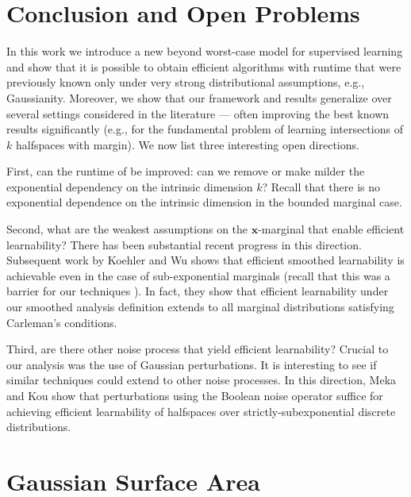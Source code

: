 \documentclass{theoretics}
\renewcommand\vec[1]{\mathbf{#1}}
\newcommand{\1}{\Ind}
\newcommand{\x}{\vec x}
\begin{document}
\section{Conclusion and Open Problems}
In this work we introduce a new beyond worst-case model for supervised learning and show that it is possible
to obtain efficient algorithms with runtime that were previously known only under very strong distributional assumptions, e.g., Gaussianity.  Moreover, we show that our framework and results generalize over several
settings considered in the literature --- often improving the best known results significantly (e.g., 
for the fundamental problem of learning intersections of $k$ halfspaces with margin). We now list three interesting open directions. 

First, can the runtime 
of  be improved: can we remove or make milder the exponential dependency on the intrinsic dimension $k$? Recall that there is no exponential dependence on the intrinsic dimension in the bounded marginal case. 

Second, what are the weakest assumptions on the $\x$-marginal that enable efficient learnability? There has been substantial recent progress in this direction. Subsequent work by Koehler and Wu \cite{koehler2025constructive} shows that efficient smoothed learnability is achievable even in the case of sub-exponential marginals (recall that this was a barrier for our techniques ). In fact, they show that efficient learnability under our smoothed analysis definition extends to all marginal distributions satisfying Carleman's conditions.

Third, are there other noise process that yield efficient learnability? Crucial to our analysis was the use of Gaussian perturbations. It is interesting to see if similar techniques could extend to other noise processes. In this direction, Meka and Kou \cite{kou2025smoothed} show that perturbations using the Boolean noise operator suffice for achieving efficient learnability of halfspaces over strictly-subexponential discrete distributions. 


%
%

\printbibliography

\newpage
\appendix

\section{Gaussian Surface Area}
\end{document}
